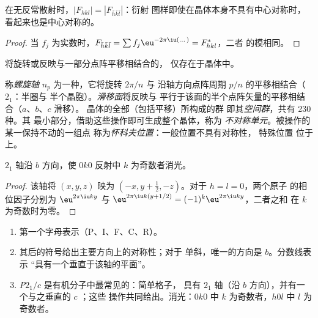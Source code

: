 \begin{proposition}[弗里德尔定律]\label{prop:b3:x-ray-diffraction:friedel}
在无反常散射时，$|F_{hkl}| = |F_{\bar h\bar k\bar l}|$：衍射
图样即使在晶体本身不具有中心对称时，看起来也是中心对称的。
\end{proposition}

\begin{proof}
当 $f_j$ 为实数时，$F_{\bar h\bar k\bar l} = \sum f_j\eu^{-2\pi\iu(\dots)} = F_{hkl}^*$，二者
的模相同。
\end{proof}

将旋转或反映与一部分点阵平移相结合的，
仅存在于晶体中。

\begin{definition}\label{def:b3:x-ray-diffraction:space-group}
称\emph{螺旋轴} $n_p$ 为一种，它将旋转 $2\pi/n$ 与
沿轴方向点阵周期 $p/n$ 的平移相结合（$2_1$：半圈与
半个晶胞）。\emph{滑移面}将反映与
平行于该面的半个点阵矢量的平移相结合（$a$、$b$、$c$ 滑移）。
晶体的全部（包括平移）所构成的群
即其\emph{空间群}，共有 230 种。其
最小部分，借助这些操作即可生成整个晶体，称为
\emph{不对称单元}。被操作的某一保持不动的一组点
称为\emph{怀科夫位置}：一般位置不具有对称性，
特殊位置
位于上。
\end{definition}

\begin{proposition}[螺旋轴的消光]\label{prop:b3:x-ray-diffraction:screw-absence}
$2_1$ 轴沿 $b$ 方向，使 $0k0$ 反射中 $k$ 为奇数者消光。
\end{proposition}

\begin{proof}
该轴将 $(x, y, z)$ 映为 $(-x, y + \frac12, -z)$。对于 $h = l = 0$，两个原子
的相位因子分别为 $\eu^{2\pi\iu ky}$ 与 $\eu^{2\pi\iu k(y + 1/2)} = (-1)^k\eu^{2\pi\iu ky}$，二者之和
在 $k$ 为奇数时为零。
\end{proof}

\begin{method}[读取空间群符号]\label{met:b3:x-ray-diffraction:read-space-group}
\begin{enumerate}
  \item 第一个字母表示（P、I、F、C、R）。
  \item 其后的符号给出主要方向上的对称性；对于
        单斜，唯一的方向是 $b$。分数线表示
        “具有一个垂直于该轴的平面”。
  \item \textit{P}$2_1/c$ 是有机分子中最常见的：简单格子，
        具有 $2_1$ 轴（沿 $b$ 方向），并有一个与之垂直的 $c$ ；这些
        操作共同给出。消光：$0k0$ 中 $k$ 为奇数者，$h0l$ 中
        $l$ 为奇数者。
\end{enumerate}
\end{method}

